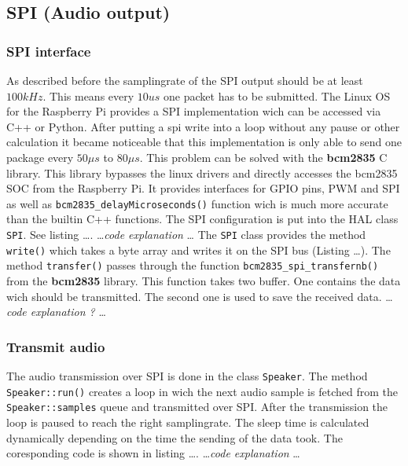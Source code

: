 \subsection{SPI (Audio output)}

\subsubsection*{SPI interface}

As described before the samplingrate of the SPI output should be at least $100kHz$. This means every $10us$ one packet has to be submitted. The Linux OS for the Raspberry Pi provides a SPI implementation wich can be accessed via C++ or Python. After putting a spi write into a loop without any pause or other calculation it became noticeable that this implementation is only able to send one package every $50\mu s$ to $80\mu s$. This problem can be solved with the \textbf{bcm2835} C library.\cite{mccauley_bcm2835_nodate} This library bypasses the linux drivers and directly accesses the bcm2835 SOC from the Raspberry Pi. It provides interfaces for GPIO pins, PWM and SPI as well as \lstinline{bcm2835_delayMicroseconds()} function wich is much more accurate than the builtin C++ functions.\p
%
The SPI configuration is put into the HAL class \lstinline{SPI}. See listing \dots.\p
\dots \textit{code explanation} \dots\p
%
The \lstinline{SPI} class provides the method \lstinline{write()} which takes a byte array and writes it on the SPI bus (Listing \dots). The method \lstinline{transfer()} passes through the function \lstinline{bcm2835_spi_transfernb()} from the \textbf{bcm2835} library. This function takes two buffer. One contains the data wich should be transmitted. The second one is used to save the received data.\p
\dots \textit{code explanation ?} \dots\p

\subsubsection*{Transmit audio}

The audio transmission over SPI is done in the class \lstinline{Speaker}. The method \lstinline{Speaker::run()} creates a loop in wich the next audio sample is fetched from the \lstinline{Speaker::samples} queue and transmitted over SPI. After the transmission the loop is paused to reach the right samplingrate. The sleep time is calculated dynamically depending on the time the sending of the data took. The coresponding code is shown in listing \dots.\p
\dots \textit{code explanation} \dots\p

